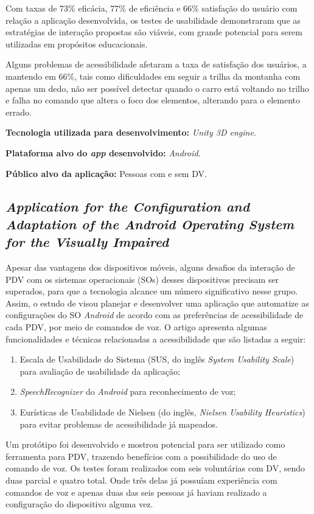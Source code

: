 Com taxas de 73\% eficácia, 77\% de eficiência e 66\% satisfação do usuário com relação a aplicação desenvolvida, os testes de usabilidade demonstraram que as estratégias de interação propostas são viáveis, com grande potencial para serem utilizadas em propósitos educacionais.

Alguns problemas de acessibilidade afetaram a taxa de satisfação dos usuários, a mantendo em 66\%, tais como dificuldades em seguir a trilha da montanha com apenas um dedo, não ser possível detectar quando o carro está voltando no trilho e falha no comando que altera o foco dos elementos, alterando para o elemento errado.

\textbf{Tecnologia utilizada para desenvolvimento:} \emph{Unity 3D engine}.

\textbf{Plataforma alvo do \emph{app} desenvolvido:} \emph{Android}.

\textbf{Público alvo da aplicação:} Pessoas com e sem DV\@.

\subsection{\emph{Application for the Configuration and Adaptation of the Android Operating System for the Visually Impaired}}

Apesar das vantagens dos dispositivos móveis, alguns desafios da interação de PDV com os sistemas operacionais (SOs) desses dispositivos precisam ser superados, para que a tecnologia alcance
um número significativo nesse grupo. Assim, o estudo de  visou planejar e desenvolver uma aplicação que automatize as configurações do SO \emph{Android} de acordo com
as preferências de acessibilidade de cada PDV, por meio de comandos de voz. O artigo apresenta algumas funcionalidades e técnicas relacionadas a acessibilidade que são listadas a seguir:

\begin{enumerate}
    \item Escala de Usabilidade do Sistema (SUS, do inglês \emph{System Usability Scale}) para avaliação de usabilidade da aplicação;
    \item \emph{SpeechRecognizer} do \emph{Android} para reconhecimento de voz;
    \item Eurísticas de Usabilidade de Nielsen (do inglês, \emph{Nielsen Usability Heuristics}) para evitar problemas de acessibilidade já mapeados.
\end{enumerate}

Um protótipo foi desenvolvido e mostrou potencial para ser utilizado como ferramenta para PDV, trazendo benefícios com a possibilidade do uso de comando de voz.
Os testes foram realizados com seis voluntárias com DV, sendo duas parcial e quatro total.
Onde três delas já possuíam experiência com comandos de voz e apenas duas das seis pessoas já haviam realizado a configuração do dispositivo alguma vez.


